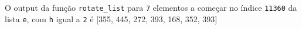 \documentclass[12pt,varwidth=16cm,border=1pt]{standalone}
\begin{document}
O output da função \verb+rotate_list+ para \verb+7+ elementos a começar no índice \verb+11360+ da lista \verb+e+, com \verb+h+ igual a \verb+2+ é [355, 445, 272, 393, 168, 352, 393] 

\questiomtrue
\end{document}
